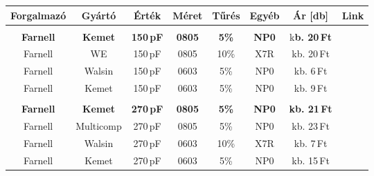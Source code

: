 \begin{center}
	\begin{tabular}{ c c c c c c c c }
		\textbf{Forgalmazó} & \textbf{Gyártó} & \textbf{Érték} & \textbf{Méret} & \textbf{Tűrés} & \textbf{Egyéb} & \textbf{Ár [db]} & \textbf{Link}\\
		
		\hline \\
		
		\textbf{Farnell} & \textbf{Kemet} & \textbf{150\,pF} & \textbf{0805} & \textbf{5\%} & \textbf{NP0} & k\textbf{b. 20\,Ft} & \textbf{\cite{kemet_150p_0805}} \\[10pt]
		
		Farnell & WE & 150\,pF & 0805 & 10\% & X7R & kb. 20\,Ft & \cite{we_150p_0805} \\[10pt]
		
		Farnell & Walsin & 150\,pF & 0603 & 5\% & NP0 & kb. 6\,Ft & \cite{walsin_150p_0603} \\[10pt]
		
		Farnell & Kemet & 150\,pF & 0603 & 5\% & NP0 & kb. 9\,Ft & \cite{kemet_150p_0603} \\[10pt]
		
		\hline \\
		
		\textbf{Farnell} & \textbf{Kemet} & \textbf{270\,pF} & \textbf{0805} & \textbf{5\%} & \textbf{NP0} & \textbf{kb. 21\,Ft} & \textbf{\cite{kemet_270p_0805}} \\[10pt]
		
		Farnell & Multicomp & 270\,pF & 0805 & 5\% & NP0 & kb. 23\,Ft & \cite{multicomp_270p_0805} \\[10pt]
		
		Farnell & Walsin & 270\,pF & 0603 & 10\% & X7R & kb. 7\,Ft & \cite{walsin_270p_0603} \\[10pt]
		
		Farnell & Kemet & 270\,pF & 0603 & 5\% & NP0 & kb. 15\,Ft & \cite{kemet_270p_0603} \\[10pt]
		
	\end{tabular}
\end{center}